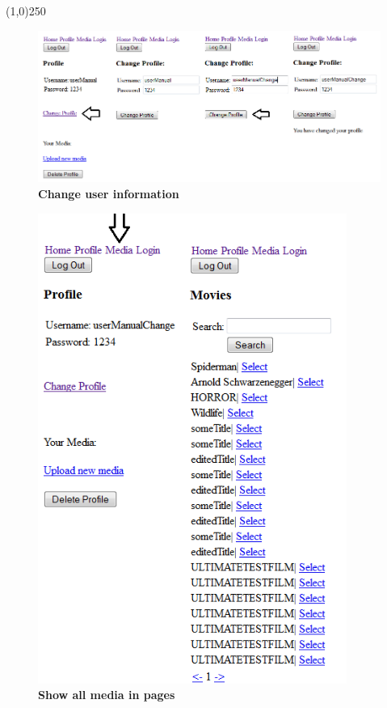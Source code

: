 \documentclass[11pt]{article}
\begin{document}
\begin{center}\line(1,0){250}\end{center}

\begin{figure}[H]
  \caption{\textbf{Change user information}}
  \centering
    \includegraphics[width=1\textwidth]{images/UM_change_user.png}
\end{figure}

\begin{figure}[H]
  \caption{\textbf{Show all media in pages}}
  \centering
    \includegraphics[width=0.9\textwidth]{images/UM_show_media.png}
\end{figure}
\end{document}
